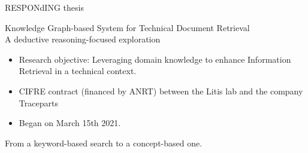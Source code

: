 
\begin{frame}{RESPONdING thesis}
    \begin{center}
        Knowledge Graph-based System for Technical Document Retrieval\\A deductive reasoning-focused exploration
    \end{center}
    
    \begin{itemize}
        \item Research objective: Leveraging domain knowledge to enhance Information Retrieval in a technical context.
        \item CIFRE contract (financed by ANRT) between the Litis lab and the company Traceparts 
        \item Began on March 15th 2021.
    \end{itemize}
    
    \begin{center}
        From a keyword-based search to a concept-based one.
    \end{center}
    
\end{frame}

